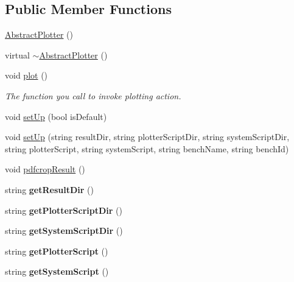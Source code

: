 \subsection*{Public Member Functions}
\begin{DoxyCompactItemize}
\item 
\hyperlink{classAbstractPlotter_abd07735ceab6cc265d20718eb2dff507}{Abstract\-Plotter} ()
\item 
virtual \hyperlink{classAbstractPlotter_a630ab1371d2fa7ed9fffaada376d811f}{$\sim$\-Abstract\-Plotter} ()
\item 
void \hyperlink{classAbstractPlotter_ada48f07c2ab32681a5ab2820a1da03d3}{plot} ()
\begin{DoxyCompactList}\small\item\em The function you call to invoke plotting action. \end{DoxyCompactList}\item 
void \hyperlink{classAbstractPlotter_a7f776c9984d55995c4a9451104e64b94}{set\-Up} (bool is\-Default)
\item 
void \hyperlink{classAbstractPlotter_ae37ab7c7a68af220a507c302f9772dd7}{set\-Up} (string result\-Dir, string plotter\-Script\-Dir, string system\-Script\-Dir, string plotter\-Script, string system\-Script, string bench\-Name, string bench\-Id)
\item 
void \hyperlink{classAbstractPlotter_a76f76a06832607e15d046cce892c80c6}{pdfcrop\-Result} ()
\item 
\hypertarget{classAbstractPlotter_ad351d64dd583f428aead5bc98c5a01bf}{string {\bfseries get\-Result\-Dir} ()}\label{classAbstractPlotter_ad351d64dd583f428aead5bc98c5a01bf}

\item 
\hypertarget{classAbstractPlotter_aa694f76a789589c72b2fe9dd619616b6}{string {\bfseries get\-Plotter\-Script\-Dir} ()}\label{classAbstractPlotter_aa694f76a789589c72b2fe9dd619616b6}

\item 
\hypertarget{classAbstractPlotter_ab34aa7c8530df29f7d11b7205a3c3eea}{string {\bfseries get\-System\-Script\-Dir} ()}\label{classAbstractPlotter_ab34aa7c8530df29f7d11b7205a3c3eea}

\item 
\hypertarget{classAbstractPlotter_af22d7db040739ed919d847878a4349b9}{string {\bfseries get\-Plotter\-Script} ()}\label{classAbstractPlotter_af22d7db040739ed919d847878a4349b9}

\item 
\hypertarget{classAbstractPlotter_af6ff3e155d1e2ebb4f6cbbd2a0002d9f}{string {\bfseries get\-System\-Script} ()}\label{classAbstractPlotter_af6ff3e155d1e2ebb4f6cbbd2a0002d9f}


\end{DoxyCompactItemize}
